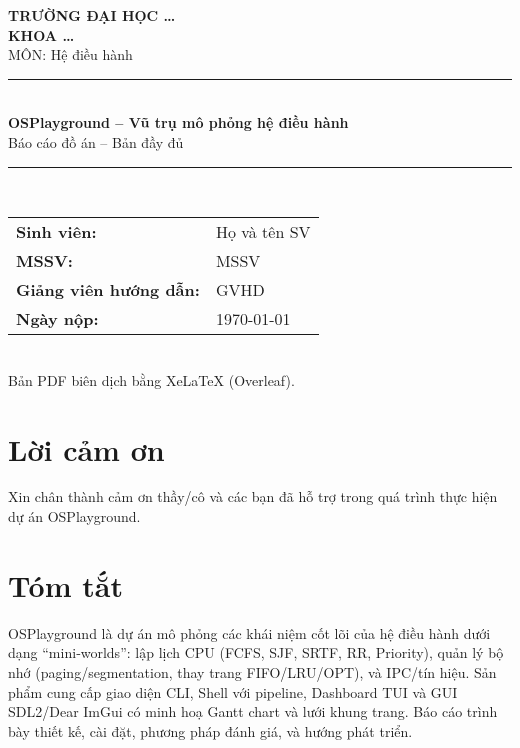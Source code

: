 \documentclass[12pt,a4paper]{report}
\newcommand{\university}{TRƯỜNG ĐẠI HỌC …}
\newcommand{\faculty}{KHOA …}
\newcommand{\course}{MÔN: Hệ điều hành}
\newcommand{\reporttitle}{OSPlayground – Vũ trụ mô phỏng hệ điều hành}
\newcommand{\studentname}{Họ và tên SV}
\newcommand{\studentid}{MSSV}
\newcommand{\instructor}{GVHD}
\newcommand{\dateofreport}{\today}
\begin{document}
\begin{titlepage}
  \begin{center}
    {\Large \textbf{\university}}\\[4pt]
    {\large \textbf{\faculty}}\\[20pt]
    {\large \course}\\[24pt]
    \rule{0.8\linewidth}{0.6pt}\\[12pt]
    {\LARGE \textbf{\reporttitle}}\\[8pt]
    {\large Báo cáo đồ án – Bản đầy đủ}\
    \rule{0.8\linewidth}{0.6pt}\\[32pt]
    \vspace{8pt}
    \begin{tabular}{p{3cm}l}
      \textbf{Sinh viên:} & \studentname\\
      \textbf{MSSV:} & \studentid\\
      \textbf{Giảng viên hướng dẫn:} & \instructor\\
      \textbf{Ngày nộp:} & \dateofreport\\
    \end{tabular}
    \\
    \vfill
    {\small Bản PDF biên dịch bằng XeLaTeX (Overleaf).}
  \end{center}
\end{titlepage}

\chapter*{Lời cảm ơn}
Xin chân thành cảm ơn thầy/cô và các bạn đã hỗ trợ trong quá trình thực hiện dự án OSPlayground.

\chapter*{Tóm tắt}
OSPlayground là dự án mô phỏng các khái niệm cốt lõi của hệ điều hành dưới dạng “mini‑worlds”: lập lịch CPU (FCFS, SJF, SRTF, RR, Priority), quản lý bộ nhớ (paging/segmentation, thay trang FIFO/LRU/OPT), và IPC/tín hiệu. Sản phẩm cung cấp giao diện CLI, Shell với pipeline, Dashboard TUI và GUI SDL2/Dear ImGui có minh hoạ Gantt chart và lưới khung trang. Báo cáo trình bày thiết kế, cài đặt, phương pháp đánh giá, và hướng phát triển.

{\hypersetup{linkcolor=black}
\tableofcontents
\listoffigures
\listoftables}

\clearpage
{}
\end{document}
